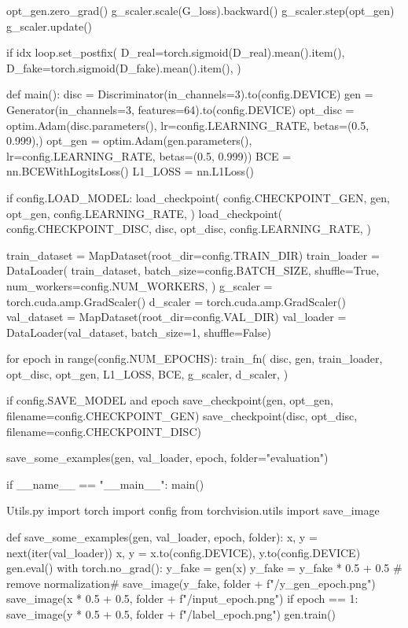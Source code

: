         opt_gen.zero_grad()
        g_scaler.scale(G_loss).backward()
        g_scaler.step(opt_gen)
        g_scaler.update()

        if idx %
            loop.set_postfix(
                D_real=torch.sigmoid(D_real).mean().item(),
                D_fake=torch.sigmoid(D_fake).mean().item(),
            )


def main():
    disc = Discriminator(in_channels=3).to(config.DEVICE)
    gen = Generator(in_channels=3, features=64).to(config.DEVICE)
    opt_disc = optim.Adam(disc.parameters(), lr=config.LEARNING_RATE, betas=(0.5, 0.999),)
    opt_gen = optim.Adam(gen.parameters(), lr=config.LEARNING_RATE, betas=(0.5, 0.999))
    BCE = nn.BCEWithLogitsLoss()
    L1_LOSS = nn.L1Loss()

    if config.LOAD_MODEL:
        load_checkpoint(
            config.CHECKPOINT_GEN, gen, opt_gen, config.LEARNING_RATE,
        )
        load_checkpoint(
            config.CHECKPOINT_DISC, disc, opt_disc, config.LEARNING_RATE,
        )

    train_dataset = MapDataset(root_dir=config.TRAIN_DIR)
    train_loader = DataLoader(
        train_dataset,
        batch_size=config.BATCH_SIZE,
        shuffle=True,
        num_workers=config.NUM_WORKERS,
    )
    g_scaler = torch.cuda.amp.GradScaler()
    d_scaler = torch.cuda.amp.GradScaler()
    val_dataset = MapDataset(root_dir=config.VAL_DIR)
    val_loader = DataLoader(val_dataset, batch_size=1, shuffle=False)

    for epoch in range(config.NUM_EPOCHS):
        train_fn(
            disc, gen, train_loader, opt_disc, opt_gen, L1_LOSS, BCE, g_scaler, d_scaler,
        )

        if config.SAVE_MODEL and epoch %
            save_checkpoint(gen, opt_gen, filename=config.CHECKPOINT_GEN)
            save_checkpoint(disc, opt_disc, filename=config.CHECKPOINT_DISC)

        save_some_examples(gen, val_loader, epoch, folder="evaluation")


if __name__ == "__main__":
    main()


Utils.py
import torch
import config
from torchvision.utils import save_image

def save_some_examples(gen, val_loader, epoch, folder):
    x, y = next(iter(val_loader))
    x, y = x.to(config.DEVICE), y.to(config.DEVICE)
    gen.eval()
    with torch.no_grad():
        y_fake = gen(x)
        y_fake = y_fake * 0.5 + 0.5  # remove normalization#
        save_image(y_fake, folder + f"/y_gen_{epoch}.png")
        save_image(x * 0.5 + 0.5, folder + f"/input_{epoch}.png")
        if epoch == 1:
            save_image(y * 0.5 + 0.5, folder + f"/label_{epoch}.png")
    gen.train()


